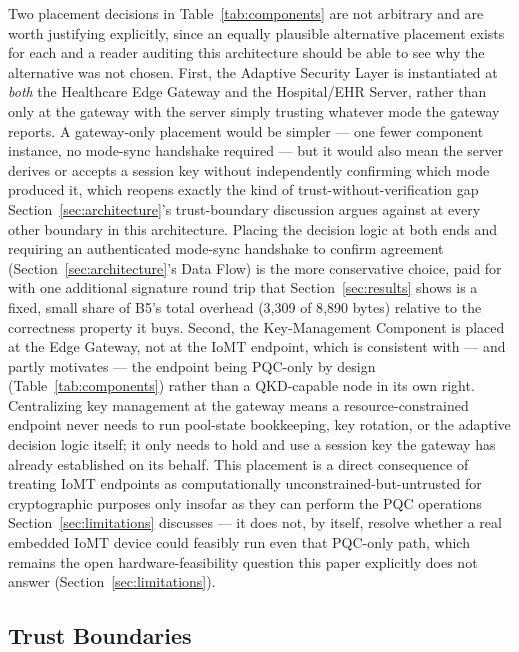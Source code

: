 \documentclass[journal]{IEEEtran}
\begin{document}
Two placement decisions in Table~\ref{tab:components} are not arbitrary and are worth justifying explicitly, since an equally plausible alternative placement exists for each and a reader auditing this architecture should be able to see why the alternative was not chosen. First, the Adaptive Security Layer is instantiated at \emph{both} the Healthcare Edge Gateway and the Hospital/EHR Server, rather than only at the gateway with the server simply trusting whatever mode the gateway reports. A gateway-only placement would be simpler --- one fewer component instance, no mode-sync handshake required --- but it would also mean the server derives or accepts a session key without independently confirming which mode produced it, which reopens exactly the kind of trust-without-verification gap Section~\ref{sec:architecture}'s trust-boundary discussion argues against at every other boundary in this architecture. Placing the decision logic at both ends and requiring an authenticated mode-sync handshake to confirm agreement (Section~\ref{sec:architecture}'s Data Flow) is the more conservative choice, paid for with one additional signature round trip that Section~\ref{sec:results} shows is a fixed, small share of B5's total overhead (3{,}309 of 8{,}890 bytes) relative to the correctness property it buys. Second, the Key-Management Component is placed at the Edge Gateway, not at the IoMT endpoint, which is consistent with --- and partly motivates --- the endpoint being PQC-only by design (Table~\ref{tab:components}) rather than a QKD-capable node in its own right. Centralizing key management at the gateway means a resource-constrained endpoint never needs to run pool-state bookkeeping, key rotation, or the adaptive decision logic itself; it only needs to hold and use a session key the gateway has already established on its behalf. This placement is a direct consequence of treating IoMT endpoints as computationally unconstrained-but-untrusted for cryptographic purposes only insofar as they can perform the PQC operations Section~\ref{sec:limitations} discusses --- it does not, by itself, resolve whether a real embedded IoMT device could feasibly run even that PQC-only path, which remains the open hardware-feasibility question this paper explicitly does not answer (Section~\ref{sec:limitations}).

\subsection{Trust Boundaries}
\end{document}
